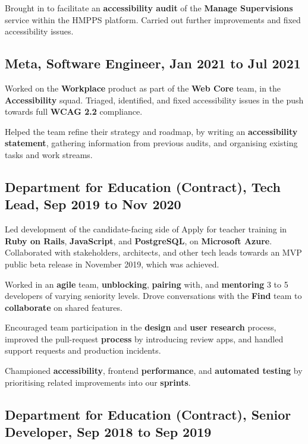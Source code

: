 \documentclass{article}
\begin{document}
Brought in to facilitate an \textbf{accessibility audit} of the \textbf{Manage
Supervisions} service within the HMPPS platform. Carried out further
improvements and fixed accessibility issues.

\subsection*{Meta, Software Engineer, Jan 2021 to Jul 2021}

Worked on the \textbf{Workplace} product as part of the \textbf{Web Core} team,
in the \textbf{Accessibility} squad. Triaged, identified, and fixed
accessibility issues in the push towards full \textbf{WCAG 2.2} compliance.

Helped the team refine their strategy and roadmap, by writing an
\textbf{accessibility statement}, gathering information from previous audits,
and organising existing tasks and work streams.

\subsection*{Department for Education (Contract), Tech Lead, Sep
2019 to Nov 2020}

Led development of the candidate-facing side of Apply for teacher training in
\textbf{Ruby on Rails}, \textbf{JavaScript}, and \textbf{PostgreSQL}, on
\textbf{Microsoft Azure}. Collaborated with stakeholders, architects, and other
tech leads towards an MVP public beta release in November 2019, which was
achieved.

Worked in an \textbf{agile} team, \textbf{unblocking}, \textbf{pairing} with,
and \textbf{mentoring} 3 to 5 developers of varying seniority levels. Drove
conversations with the \textbf{Find} team to \textbf{collaborate} on shared
features.

Encouraged team participation in the \textbf{design} and \textbf{user research}
process, improved the pull-request \textbf{process} by introducing review apps,
and handled support requests and production incidents.

Championed \textbf{accessibility}, frontend \textbf{performance}, and
\textbf{automated testing} by prioritising related improvements into our
\textbf{sprints}.

\subsection*{Department for Education (Contract), Senior Developer, Sep 2018 to
Sep 2019}
\end{document}
